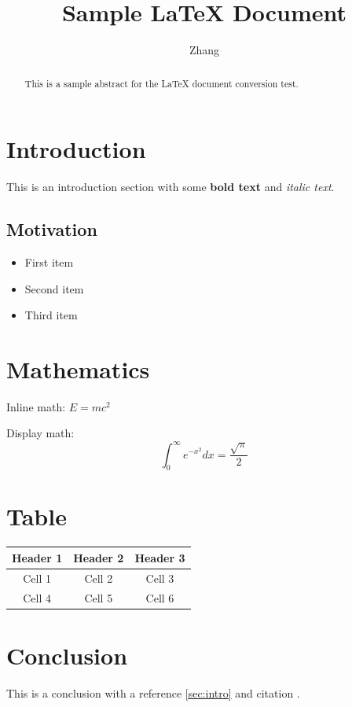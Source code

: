 \documentclass[11pt]{article}
\title{Sample LaTeX Document}
\author{Zhang}
\begin{document}
\maketitle

\begin{abstract}
This is a sample abstract for the LaTeX document conversion test.
\end{abstract}

\section{Introduction}

This is an introduction section with some \textbf{bold text} and \textit{italic text}.

\subsection{Motivation}

\begin{itemize}
\item First item
\item Second item
\item Third item
\end{itemize}

\section{Mathematics}

Inline math: $E = mc^2$

Display math:
$$
\int_{0}^{\infty} e^{-x^2} dx = \frac{\sqrt{\pi}}{2}
$$

\section{Table}

\begin{tabular}{|c|c|c|}
\hline
Header 1 & Header 2 & Header 3 \\
\hline
Cell 1 & Cell 2 & Cell 3 \\
Cell 4 & Cell 5 & Cell 6 \\
\hline
\end{tabular}

\section{Conclusion}

This is a conclusion with a reference \ref{sec:intro} and citation \cite{smith2020}.
\end{document}
